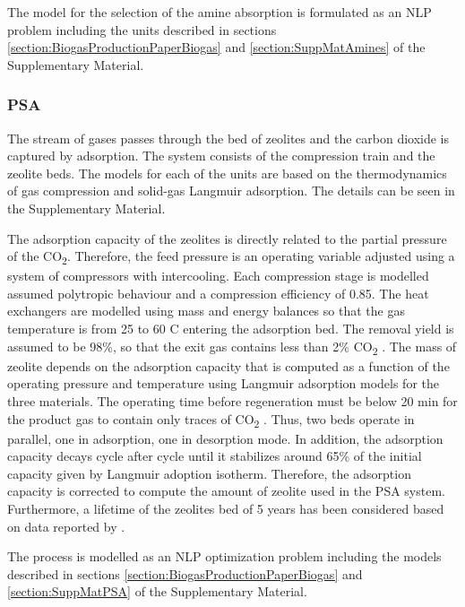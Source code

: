 \begin{refsection}[referencesCh7]
The model for the selection of the amine absorption is formulated as an NLP problem including the units described in sections \ref{section:BiogasProductionPaperBiogas} and \ref{section:SuppMatAmines} of the Supplementary Material.

\subsubsection{PSA} \label{section:MathModPSA}
The stream of gases passes through the bed of zeolites and the carbon dioxide is captured by adsorption. The system consists of the compression train and the zeolite beds. The models for each of
the units are based on the thermodynamics of gas compression and solid-gas Langmuir adsorption. The details can be seen in the Supplementary Material.

The adsorption capacity of the zeolites is directly related to the partial pressure of the CO\textsubscript{2}. Therefore, the feed pressure is an operating variable adjusted using a system of compressors with intercooling. Each compression stage is modelled assumed polytropic behaviour and a compression efficiency of 0.85. The heat exchangers are modelled using mass and energy balances so that the gas temperature is from 25 to 60 \textdegree C entering the adsorption bed. The removal yield is assumed to be 98\%, so that the exit gas contains less than 2\% CO\textsubscript{2} \citep{ferella2017separation}. The mass of zeolite depends on the adsorption capacity that is computed as a function of the operating pressure and temperature using Langmuir adsorption models for the three materials. The operating time before regeneration must be below 20 min for the product gas to contain only traces of CO\textsubscript{2} \citep{hauchhum2014carbon}. Thus, two beds operate in parallel, one in adsorption, one in desorption mode. In addition, the adsorption capacity decays cycle after cycle until it stabilizes around 65\% of the initial capacity given by Langmuir adoption isotherm. Therefore, the adsorption capacity is corrected to compute the amount of zeolite used in the PSA system. Furthermore, a lifetime of the zeolites bed of 5 years has been considered based on data reported by \citet{Xiao2013}.

The process is modelled as an NLP optimization problem including the models described in sections \ref{section:BiogasProductionPaperBiogas} and \ref{section:SuppMatPSA} of the Supplementary Material.


\end{refsection}
